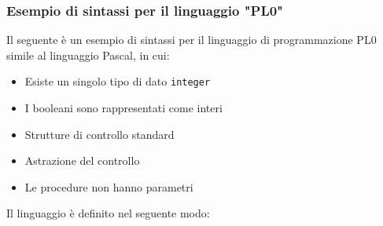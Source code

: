 \documentclass[a4paper]{article}
\begin{document}
\subsubsection{Esempio di sintassi per il linguaggio "PL0"}
Il seguente è un esempio di sintassi per il linguaggio di programmazione PL0 simile
al linguaggio Pascal, in cui:
\begin{itemize}
  \item Esiste un singolo tipo di dato \texttt{integer}
  \item I booleani sono rappresentati come interi
  \item Strutture di controllo standard
  \item Astrazione del controllo
  \item Le procedure non hanno parametri
\end{itemize}
Il linguaggio è definito nel seguente modo:
\end{document}
